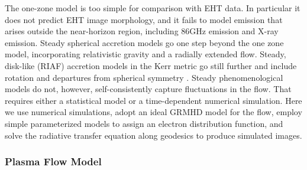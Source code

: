 The one-zone model is too simple for comparison with EHT data.  In particular it does not predict EHT image morphology, and it fails to model emission that arises outside the near-horizon region, including 86GHz emission and X-ray emission.
Steady spherical accretion models \citep[e.g.,][]{2000ApJ...528L..13F} go one  step beyond the one zone model, incorporating relativistic gravity and a radially extended flow.
Steady, disk-like (RIAF) accretion models in the Kerr metric go still further and include rotation and departures from spherical symmetry \citep[e.g.,][]{2009ApJ...697...45B, 2009ApJ...706..960H,2018ApJ...863..148P}.
Steady phenomenological models do not, however, self-consistently capture fluctuations in the flow.
That requires either a statistical model \citep{2021ApJ...906...39L} or a time-dependent numerical simulation.
Here we
use numerical simulations,
adopt an ideal GRMHD model for the flow,
employ simple parameterized models to assign an electron distribution function, and
solve the radiative transfer equation along geodesics to produce simulated images.

\subsubsection{Plasma Flow Model}

